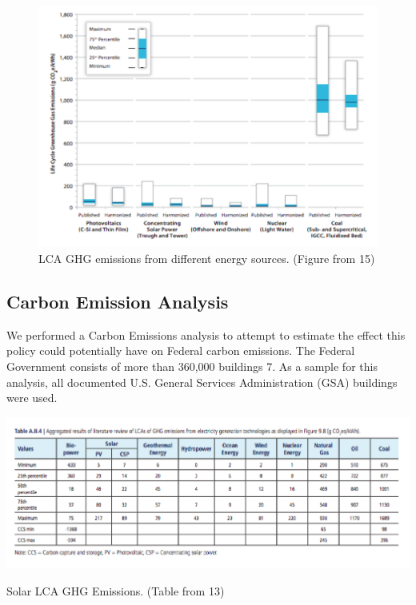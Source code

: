 \begin{figure}
\begin{center}
\includegraphics[scale=0.35]{pics/d5.png}
\caption{LCA GHG emissions from different energy sources. (Figure from \cite{debbie}{15})}
\label{d5}
\end{center}
\end{figure}

\subsection{Carbon Emission Analysis}
We performed a Carbon Emissions analysis to attempt to estimate the effect this policy could potentially have on Federal carbon emissions. The Federal Government consists of more than 360,000 buildings \cite{debbie}{7}. As a sample for this analysis, all documented U.S. General Services Administration (GSA) buildings were used.

\begin{table}
\begin{center}
\includegraphics[scale=0.43]{pics/t1.png}
\caption{Solar LCA GHG Emissions. (Table from \cite{debbie}{13})}
\label{t1}
\end{center}
\end{table}

